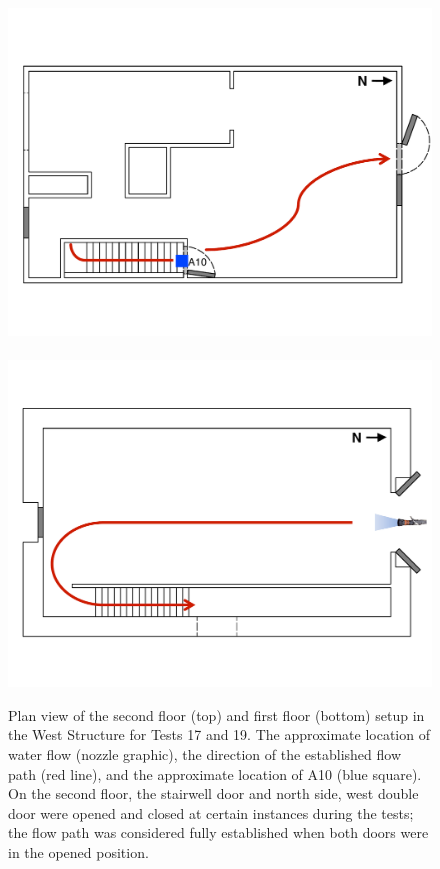 \documentclass[12pt,oneside]{book}
\begin{document}
\begin{figure}[!ht]
	\includegraphics[width=\columnwidth]{../Figures/Floor_Plans/Specific_Tests/West_Hose_Test_2nd_Floor_Annotated}
	\\~\\
	\includegraphics[width=\columnwidth]{../Figures/Floor_Plans/Specific_Tests/West_Hose_Test_19_1st_Floor_Annotated}
	\caption[Plan view of the West Structure setup for Tests 17 and 19.]{Plan view of the second floor (top) and first floor (bottom) setup in the West Structure for Tests 17 and 19. The approximate location of water flow (nozzle graphic), the direction of the established flow path (red line), and the approximate location of A10 (blue square). On the second floor, the stairwell door and north side, west double door were opened and closed at certain instances during the tests; the flow path was considered fully established when both doors were in the opened position.}
	\label{fig:flow_path_2}
\end{figure}
\FloatBarrier
\end{document}
